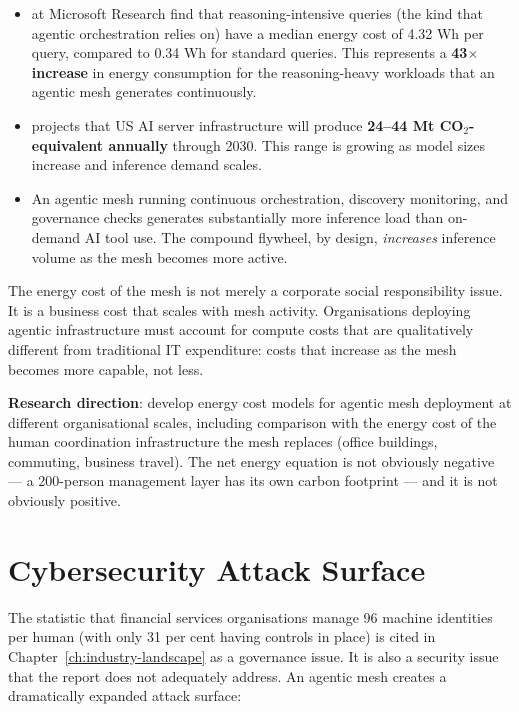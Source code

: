 \begin{evidencebox}[title={The Energy Cost of Agentic Systems}]
\begin{itemize}
  \item \textcite{Patterson2025} at Microsoft Research find that reasoning-intensive queries (the kind that agentic orchestration relies on) have a median energy cost of 4.32 Wh per query, compared to 0.34 Wh for standard queries. This represents a \textbf{43$\times$ increase} in energy consumption for the reasoning-heavy workloads that an agentic mesh generates continuously.
  \item \textcite{NatureSustainability2025} projects that US AI server infrastructure will produce \textbf{24--44 Mt CO$_2$-equivalent annually} through 2030. This range is growing as model sizes increase and inference demand scales.
  \item An agentic mesh running continuous orchestration, discovery monitoring, and governance checks generates substantially more inference load than on-demand AI tool use. The compound flywheel, by design, \emph{increases} inference volume as the mesh becomes more active.
\end{itemize}
\end{evidencebox}

The energy cost of the mesh is not merely a corporate social responsibility issue. It is a business cost that scales with mesh activity. Organisations deploying agentic infrastructure must account for compute costs that are qualitatively different from traditional IT expenditure: costs that increase as the mesh becomes more capable, not less.

\textbf{Research direction}: develop energy cost models for agentic mesh deployment at different organisational scales, including comparison with the energy cost of the human coordination infrastructure the mesh replaces (office buildings, commuting, business travel). The net energy equation is not obviously negative --- a 200-person management layer has its own carbon footprint --- and it is not obviously positive.

\section{Cybersecurity Attack Surface}

The statistic that financial services organisations manage 96 machine identities per human \parencite{CyberArk2025} (with only 31 per cent having controls in place) is cited in Chapter~\ref{ch:industry-landscape} as a governance issue. It is also a security issue that the report does not adequately address. An agentic mesh creates a dramatically expanded attack surface:


